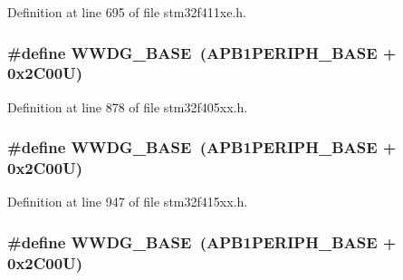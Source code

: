 Definition at line 695 of file stm32f411xe.\+h.

\subsubsection[{\texorpdfstring{W\+W\+D\+G\+\_\+\+B\+A\+SE}{WWDG_BASE}}]{\setlength{\rightskip}{0pt plus 5cm}\#define W\+W\+D\+G\+\_\+\+B\+A\+SE~({\bf A\+P\+B1\+P\+E\+R\+I\+P\+H\+\_\+\+B\+A\+SE} + 0x2\+C00\+U)}\hypertarget{group___peripheral__registers__structures_ga9a5bf4728ab93dea5b569f5b972cbe62}{}\label{group___peripheral__registers__structures_ga9a5bf4728ab93dea5b569f5b972cbe62}


Definition at line 878 of file stm32f405xx.\+h.

\subsubsection[{\texorpdfstring{W\+W\+D\+G\+\_\+\+B\+A\+SE}{WWDG_BASE}}]{\setlength{\rightskip}{0pt plus 5cm}\#define W\+W\+D\+G\+\_\+\+B\+A\+SE~({\bf A\+P\+B1\+P\+E\+R\+I\+P\+H\+\_\+\+B\+A\+SE} + 0x2\+C00\+U)}\hypertarget{group___peripheral__registers__structures_ga9a5bf4728ab93dea5b569f5b972cbe62}{}\label{group___peripheral__registers__structures_ga9a5bf4728ab93dea5b569f5b972cbe62}


Definition at line 947 of file stm32f415xx.\+h.

\subsubsection[{\texorpdfstring{W\+W\+D\+G\+\_\+\+B\+A\+SE}{WWDG_BASE}}]{\setlength{\rightskip}{0pt plus 5cm}\#define W\+W\+D\+G\+\_\+\+B\+A\+SE~({\bf A\+P\+B1\+P\+E\+R\+I\+P\+H\+\_\+\+B\+A\+SE} + 0x2\+C00\+U)}\hypertarget{group___peripheral__registers__structures_ga9a5bf4728ab93dea5b569f5b972cbe62}{}\label{group___peripheral__registers__structures_ga9a5bf4728ab93dea5b569f5b972cbe62}


